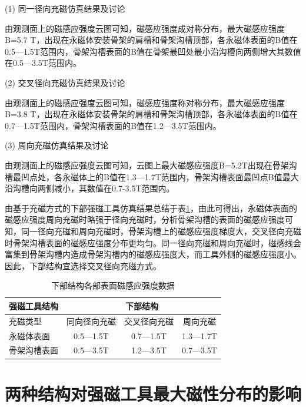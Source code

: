 (1) 同一径向充磁仿真结果及讨论

由观测面上的磁感应强度云图可知，磁感应强度成对称分布，最大磁感应强度B=5.7 T，出现在永磁体安装骨架的肩槽和骨架沟槽顶部，各永磁体表面的B值在0.5—1.5T范围内，骨架沟槽表面的B值在骨架最凹处最小沿沟槽向两侧增大其数值在0.5—3.5T范围内。

(2) 交叉径向充磁仿真结果及讨论

由观测面上的磁感应强度云图可知，磁感应强度称对称分布，最大磁感应强度B=3.8 T，出现在永磁体安装骨架的肩槽和骨架沟槽顶部，各永磁体表面的B值在0.7—1.5T范围内，骨架沟槽表面的B值在1.2—3.5T范围内。

(3) 周向充磁仿真结果及讨论

由观测面上的磁感应强度云图可知，云图上最大磁感应强度B=5.2T出现在骨架沟槽最凹点处，各永磁体上的B值在1.3—1.7T范围内，骨架沟槽表面最凹点B值最大沿沟槽向两侧减小，其数值在0.7-3.5T范围内。


由基于充磁方式的下部强磁工具仿真结果总结于表\ref{tab:magnetic_intensity}，由此可得出，永磁体表面的磁感应强度周向充磁时略强于径向充磁时，分析骨架沟槽的表面的磁感应强度可知，同一径向充磁和周向充磁时，骨架沟槽上的磁感应强度梯度大，交叉径向充磁时骨架沟槽表面的磁感应强度分布更均匀。同一径向充磁和周向充磁时，磁感线会富集到骨架沟槽内造成骨架沟槽内的磁感应强度大，而工具外侧的磁感应强度小。因此，下部结构宜选择交叉径向充磁方式。

\begin{table}[htbp]
    \centering
    \caption{下部结构各部表面磁感应强度数据}
    \label{tab:magnetic_intensity}
    \begin{tabularx}{.9\textwidth}{Xccc} %
        \toprule
        强磁工具结构 & \multicolumn{3}{c}{下部结构} \\
        \midrule
        充磁类型 & 同向径向充磁 & 交叉径向充磁 & 周向充磁 \\
        \midrule
        永磁体表面 & 0.5---1.5T & 0.7---1.5T & 1.3---1.7T \\
        骨架沟槽表面 & 0.5---3.5T & 1.2---3.5T & 0.7---3.5T \\
        \bottomrule
    \end{tabularx}
\end{table}

\section{两种结构对强磁工具最大磁性分布的影响}

